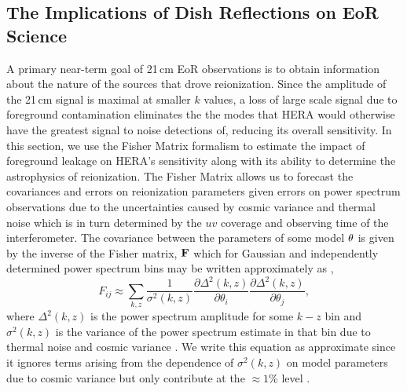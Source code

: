 \documentclass[twocolumn]{emulateapj}
\begin{document}
\subsection{The Implications of Dish Reflections on EoR Science}\label{ssec:Science}
A primary near-term goal of 21\,cm EoR observations is to obtain information about the nature of the sources that drove reionization. Since the amplitude of the 21\,cm signal is maximal at smaller $k$ values, a loss of large scale signal due to foreground contamination eliminates the the modes that HERA would otherwise have the greatest signal to noise detections of, reducing its overall sensitivity. In this section, we use the Fisher Matrix formalism to estimate the impact of foreground leakage on HERA's sensitivity along with its ability to determine the astrophysics of reionization. The Fisher Matrix allows us to forecast the covariances and errors on reionization parameters given errors on power spectrum observations due to the uncertainties caused by cosmic variance and thermal noise which is in turn determined by the $uv$ coverage and observing time of the interferometer. The covariance between the parameters of some model ${\bf \theta}$ is given by the inverse of the Fisher matrix, ${\bf F}$ which for Gaussian and independently determined power spectrum bins may be written approximately as \citep{Pober:2014},
\begin{equation}\label{eq:Fisher}
F_{ij} \approx \sum_{k,z} \frac{1}{\sigma^2(k,z)} \frac{\partial \Delta^2(k,z)}{\partial \theta_i} \frac{\partial \Delta^2(k,z)}{\partial \theta_j},
\end{equation}
where $\Delta^2(k,z)$ is the power spectrum amplitude for some $k-z$ bin and $\sigma^2(k,z)$ is the variance of the power spectrum estimate in that bin due to thermal noise and cosmic variance \citep{Beardsley:2013}. We write this equation as approximate since it ignores terms arising from the dependence of $\sigma^2(k,z)$ on model parameters due to cosmic variance but only contribute at the $\approx 1$\% level \citep{EwallWice:2015b}. 
\end{document}
